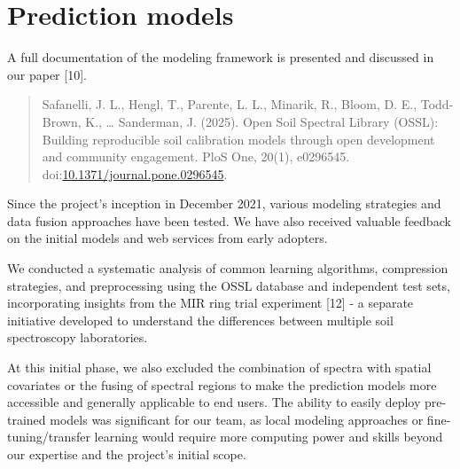 \documentclass[
  letterpaper,
  DIV=11,
  numbers=noendperiod]{scrreprt}
\begin{document}

\chapter{Prediction models}\label{sec-prediction-models}

\begin{tcolorbox}[enhanced jigsaw, title=\textcolor{quarto-callout-tip-color}{\faLightbulb}\hspace{0.5em}{Tip}, rightrule=.15mm, coltitle=black, opacityback=0, bottomrule=.15mm, colframe=quarto-callout-tip-color-frame, breakable, arc=.35mm, titlerule=0mm, toptitle=1mm, left=2mm, colback=white, toprule=.15mm, leftrule=.75mm, bottomtitle=1mm, opacitybacktitle=0.6, colbacktitle=quarto-callout-tip-color!10!white]

A full documentation of the modeling framework is presented and
discussed in our paper {[}10{]}.

\begin{quote}
Safanelli, J. L., Hengl, T., Parente, L. L., Minarik, R., Bloom, D. E.,
Todd-Brown, K., \ldots{} Sanderman, J. (2025). Open Soil Spectral
Library (OSSL): Building reproducible soil calibration models through
open development and community engagement. PloS One, 20(1), e0296545.
doi:\href{https://doi.org/10.1371/journal.pone.0296545}{10.1371/journal.pone.0296545}.
\end{quote}

\end{tcolorbox}

Since the project's inception in December 2021, various modeling
strategies and data fusion approaches have been tested. We have also
received valuable feedback on the initial models and web services from
early adopters.

We conducted a systematic analysis of common learning algorithms,
compression strategies, and preprocessing using the OSSL database and
independent test sets, incorporating insights from the MIR ring trial
experiment {[}12{]} - a separate initiative developed to understand the
differences between multiple soil spectroscopy laboratories.

At this initial phase, we also excluded the combination of spectra with
spatial covariates or the fusing of spectral regions to make the
prediction models more accessible and generally applicable to end users.
The ability to easily deploy pre-trained models was significant for our
team, as local modeling approaches or fine-tuning/transfer learning
would require more computing power and skills beyond our expertise and
the project's initial scope.
\end{document}
